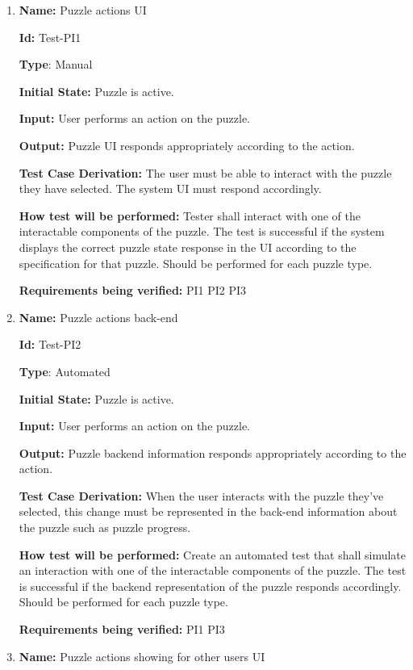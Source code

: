 \documentclass[12pt, titlepage]{article}
\begin{document}
\begin{enumerate}

\item{\textbf{Name:} Puzzle actions UI} \label{itm:Test-PI2}

\textbf{Id:} Test-PI1

\textbf{Type}: Manual

\textbf{Initial State:} Puzzle is active.

\textbf{Input:} User performs an action on the puzzle.

\textbf{Output:} Puzzle UI responds appropriately according to the action.

\textbf{Test Case Derivation:}
The user must be able to interact with the puzzle they have selected. The system UI must respond accordingly.

\textbf{How test will be performed:}
Tester shall interact with one of the interactable components of the puzzle. The test is successful if the system displays the correct puzzle state response in the UI according to the specification for that puzzle. Should be performed for each puzzle type.

\textbf{Requirements being verified: } PI1 PI2 PI3

\item{\textbf{Name:} Puzzle actions back-end} \label{itm:Test-PI3}

\textbf{Id:} Test-PI2

\textbf{Type}: Automated

\textbf{Initial State:} Puzzle is active.

\textbf{Input:} User performs an action on the puzzle.

\textbf{Output:} Puzzle backend information responds appropriately according to the action.

\textbf{Test Case Derivation:}
When the user interacts with the puzzle they've selected, this change must be represented in the back-end information about the puzzle such as puzzle progress.

\textbf{How test will be performed:}
Create an automated test that shall simulate an interaction with one of the interactable components of the puzzle. The test is successful if the backend representation of the puzzle responds accordingly. Should be performed for each puzzle type.

\textbf{Requirements being verified: } PI1 PI3

\item{\textbf{Name:} Puzzle actions showing for other users UI} \label{itm:Test-PI4}


\end{enumerate}
\end{document}
